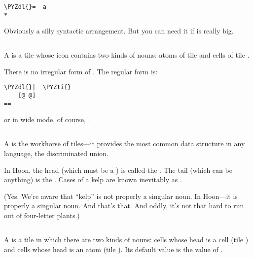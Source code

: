 \begin{framed_shaded}
\begin{Verbatim}[fontsize=\relsize{-2.5},fontseries=b,commandchars=\\\{\}]
\PYZdl{}=  a
*
\end{Verbatim}
\end{framed_shaded}
Obviously a silly syntactic arrangement.  But you can need it if
 is really big.

\subsection{\kode{[\%reed p=tile q=tile]}}

A  is a tile whose icon contains two kinds of nouns: atoms
of tile  and cells of tile .

There is no irregular form of .  The regular form is:

\begin{framed_shaded}
\begin{Verbatim}[fontsize=\relsize{-2.5},fontseries=b,commandchars=\\\{\}]
\PYZdl{}|  \PYZti{}
    [@ @]
==
\end{Verbatim}
\end{framed_shaded}
or in wide mode, of course, \kode{\$\textbar{}(\sig  [@ @])}.

\subsection{\kode{[\%kelp p=[i=line t=(list line)]]}}

A  is the workhorse of tiles---it provides the most common
data structure in any language, the discriminated union.  

In Hoon, the head (which must be a ) is called the .
The tail (which can be anything) is the .  Cases of a kelp
are known inevitably as .  

(Yes.  We're aware that ``kelp'' is not properly a singular noun.
In Hoon---it is properly a singular noun.  And that's that.  And 
oddly, it's not that hard to run out of four-letter plants.)

\subsection{\kode{[\%bush p=tile q=tile]}}

A  is a tile in which there are two kinds of nouns: cells
whose head is a cell (tile ) and cells whose head is an atom
(tile ).  Its default value is the value of .


